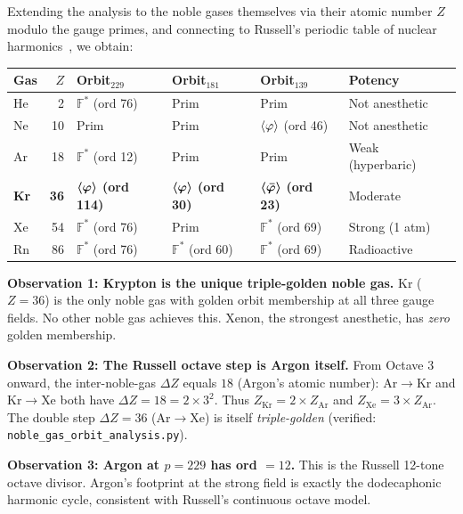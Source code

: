 \begin{remark}
\label{rem:noble_gas_orbits}
Extending the analysis to the noble gases themselves via their atomic number $Z$ modulo the gauge primes, and connecting to Russell's periodic table of nuclear harmonics~\cite{Russell1926}, we obtain:

\begin{center}
{\small
\begin{tabular}{@{}lrllll@{}}
\toprule
\textbf{Gas} & $Z$ & \textbf{Orbit$_{229}$} & \textbf{Orbit$_{181}$} & \textbf{Orbit$_{139}$} & \textbf{Potency} \\
\midrule
He &  2 & $\mathbb{F}^*$ (ord 76)  & Prim & Prim & Not anesthetic \\
Ne & 10 & Prim                      & Prim & $\langle\varphi\rangle$ (ord 46) & Not anesthetic \\
Ar & 18 & $\mathbb{F}^*$ (ord 12)  & Prim & Prim & Weak (hyperbaric) \\
\textbf{Kr} & \textbf{36} & $\boldsymbol{\langle\varphi\rangle}$ \textbf{(ord 114)} & $\boldsymbol{\langle\varphi\rangle}$ \textbf{(ord 30)} & $\boldsymbol{\langle\bar{\varphi}\rangle}$ \textbf{(ord 23)} & Moderate \\
Xe & 54 & $\mathbb{F}^*$ (ord 76)  & Prim & $\mathbb{F}^*$ (ord 69) & Strong (1 atm) \\
Rn & 86 & $\mathbb{F}^*$ (ord 76)  & $\mathbb{F}^*$ (ord 60) & $\mathbb{F}^*$ (ord 69) & Radioactive \\
\bottomrule
\end{tabular}
}
\end{center}

\textbf{Observation 1: Krypton is the unique triple-golden noble gas.} Kr ($Z = 36$) is the only noble gas with golden orbit membership at all three gauge fields. No other noble gas achieves this. Xenon, the strongest anesthetic, has \emph{zero} golden membership.

\textbf{Observation 2: The Russell octave step is Argon itself.} From Octave 3 onward, the inter-noble-gas $\Delta Z$ equals $18$ (Argon's atomic number): Ar$\to$Kr and Kr$\to$Xe both have $\Delta Z = 18 = 2 \times 3^2$. Thus $Z_{\mathrm{Kr}} = 2 \times Z_{\mathrm{Ar}}$ and $Z_{\mathrm{Xe}} = 3 \times Z_{\mathrm{Ar}}$. The double step $\Delta Z = 36$ (Ar$\to$Xe) is itself \emph{triple-golden} (verified: \texttt{noble\_gas\_orbit\_analysis.py}).

\textbf{Observation 3: Argon at $p = 229$ has ord $= 12$.} This is the Russell 12-tone octave divisor. Argon's footprint at the strong field is exactly the dodecaphonic harmonic cycle, consistent with Russell's continuous octave model.


\end{remark}
